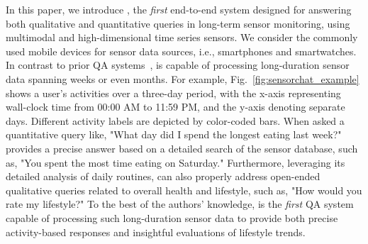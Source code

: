 In this paper, we introduce \Method, the \textit{first} end-to-end system designed for answering both qualitative and quantitative queries in long-term sensor monitoring, using multimodal and high-dimensional time series sensors.
We consider the commonly used mobile devices for sensor data sources, i.e., smartphones and smartwatches.
In contrast to prior QA systems~\cite{xing2021deepsqa,nie2022ai,chen2024sensor2text,arakawa2024prism,yang2024drhouse}, \Method is capable of processing long-duration sensor data spanning weeks or even months. For example, Fig.~\ref{fig:sensorchat_example} shows a user's activities over a three-day period, with the x-axis representing wall-clock time from 00:00 AM to 11:59 PM, and the y-axis denoting separate days. Different activity labels are depicted by color-coded bars.
When asked a quantitative query like, "What day did I spend the longest eating last week?" \Method provides a precise answer based on a detailed search of the sensor database, such as, "You spent the most time eating on Saturday."
Furthermore, leveraging its detailed analysis of daily routines, \Method can also properly address open-ended qualitative queries related to overall health and lifestyle, such as, "How would you rate my lifestyle?"
To the best of the authors' knowledge, \Method is the \textit{first} QA system capable of processing such long-duration sensor data to provide both precise activity-based responses and insightful evaluations of lifestyle trends.

